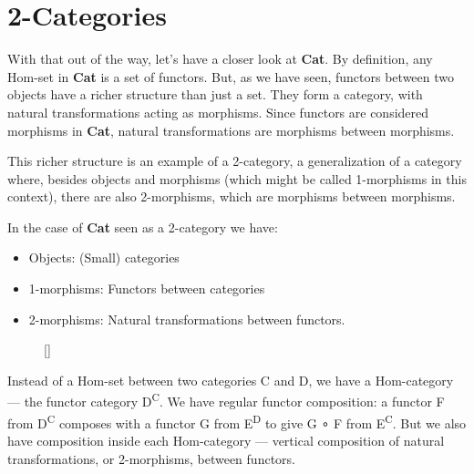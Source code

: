 \section{2-Categories}\label{categories}

With that out of the way, let's have a closer look at \textbf{Cat}. By
definition, any Hom-set in \textbf{Cat} is a set of functors. But, as we
have seen, functors between two objects have a richer structure than
just a set. They form a category, with natural transformations acting as
morphisms. Since functors are considered morphisms in \textbf{Cat},
natural transformations are morphisms between morphisms.

This richer structure is an example of a 2-category, a generalization of
a category where, besides objects and morphisms (which might be called
1-morphisms in this context), there are also 2-morphisms, which are
morphisms between morphisms.

In the case of \textbf{Cat} seen as a 2-category we have:

\begin{itemize}
\tightlist
\item
  Objects: (Small) categories
\item
  1-morphisms: Functors between categories
\item
  2-morphisms: Natural transformations between functors.
\end{itemize}

\begin{figure}
\raisebox{0pt}[\dimexpr{}\baselineskip\relax]{
}%
\end{figure}

\noindent
Instead of a Hom-set between two categories C and D, we have a
Hom-category --- the functor category D\textsuperscript{C}. We have
regular functor composition: a functor F from D\textsuperscript{C}
composes with a functor G from E\textsuperscript{D} to give G ∘ F from
E\textsuperscript{C}. But we also have composition inside each
Hom-category --- vertical composition of natural transformations, or
2-morphisms, between functors.

